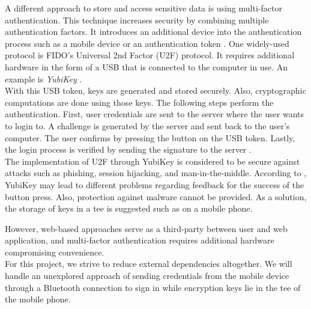 A different approach to store and access sensitive data is using multi-factor authentication. This technique increases security by combining multiple authentication factors. It introduces an additional device into the authentication process such as a mobile device or an authentication token \cite{DBLP:conf/csfw/JacommeK18}. One widely-used protocol is FIDO's Universal 2nd Factor (U2F) protocol. It requires additional hardware in the form of a USB that is connected to the computer in use. An example is \textit{YubiKey} \cite{Yubikey}. \\
With this USB token, keys are generated and stored securely. Also, cryptographic computations are done using those keys. The following steps perform the authentication. First, user credentials are sent to the server where the user wants to login to. A challenge is generated by the server and sent back to the user's computer. The user confirms by pressing the button on the USB token. Lastly, the login process is verified by sending the signature to the server \cite{DBLP:conf/csfw/JacommeK18}. \\
The implementation of U2F through YubiKey is considered to be secure against attacks such as phishing, session hijacking, and man-in-the-middle. According to \cite{DBLP:conf/csfw/JacommeK18}, YubiKey may lead to different problems regarding feedback for the success of the button press. Also, protection against malware cannot be provided. As a solution, the storage of keys in a \gls{tee} is suggested such as on a mobile phone.

However, web-based approaches serve as a third-party between user and web application, and multi-factor authentication requires additional hardware compromising convenience. \\
For this project, we strive to reduce external dependencies altogether. We will handle an unexplored approach of sending credentials from the mobile device through a Bluetooth connection to sign in while encryption keys lie in the \gls{tee} of the mobile phone.
